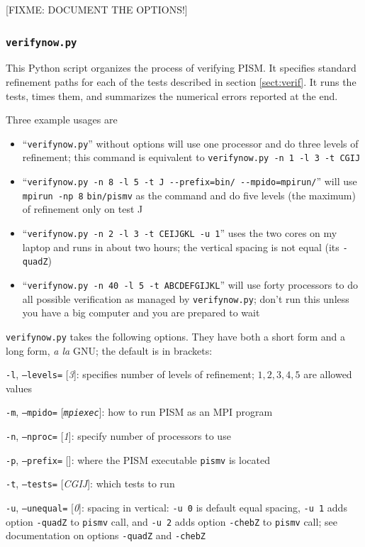 \documentclass[11pt,final]{amsart}
\newcommand{\optoptdef}[3]{\vspace{1mm}\noindent \large\texttt{-#1},\,\,\texttt{--#2=}\normalsize\,\,[\textsl{#3}]:\quad}
\begin{document}
[FIXME: DOCUMENT THE OPTIONS!]


\subsubsection*{\Large{\texttt{verifynow.py}}}  This Python script organizes the process of verifying PISM.  It specifies standard refinement paths for each of the tests described in section \ref{sect:verif}.  It runs the tests, times them, and summarizes the numerical errors reported at the end.

Three example usages are \begin{itemize}
\item ``\verb|verifynow.py|'' without options will use one processor and do three levels of refinement; this command is equivalent to \verb|verifynow.py -n 1 -l 3 -t CGIJ|
\item ``\verb|verifynow.py -n 8 -l 5 -t J --prefix=bin/ --mpido=mpirun/|'' will use \verb|mpirun -np 8| \verb|bin/pismv| as the command and do five levels (the maximum) of refinement only on test J
\item ``\verb|verifynow.py -n 2 -l 3 -t CEIJGKL -u 1|'' uses the two cores on my laptop and runs in about two hours; the vertical spacing is not equal (its \verb|-quadZ|)
\item ``\verb|verifynow.py -n 40 -l 5 -t ABCDEFGIJKL|'' will use forty processors to do all possible verification as managed by \verb|verifynow.py|; don't run this unless you have a big computer and you are prepared to wait
\end{itemize}

\verb|verifynow.py| takes the following options.  They have both a short form and a long form, \emph{a la} GNU; the default is in brackets:

\optoptdef{l}{levels}{3} specifies number of levels of refinement; $1,2,3,4,5$ are allowed values

\optoptdef{m}{mpido}{\texttt{mpiexec}} how to run PISM as an MPI program

\optoptdef{n}{nproc}{1} specify number of processors to use

\optoptdef{p}{prefix}{} where the PISM executable \verb|pismv| is located

\optoptdef{t}{tests}{CGIJ} which tests to run

\optoptdef{u}{unequal}{0} spacing in vertical: \verb|-u 0| is default equal spacing, \verb|-u 1| adds option \verb|-quadZ| to \verb|pismv| call, and \verb|-u 2| adds option \verb|-chebZ| to \verb|pismv| call; see documentation on options \verb|-quadZ| and  \verb|-chebZ|
\end{document}
